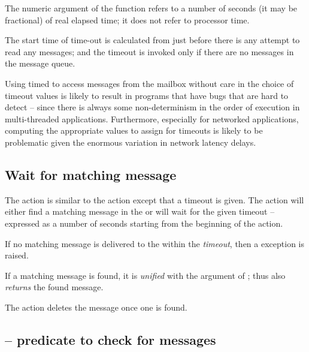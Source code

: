 The numeric argument of the  function refers to a number of seconds (it may be fractional) of real elapsed time; it does not refer to processor time.

The start time of time-out is calculated from just before there is any attempt to read any messages; and the timeout is invoked only if there are no messages in the message queue.

\begin{aside}[\dbend\dbend]
Using timed  to access messages from the mailbox without care in the choice of timeout values is likely to result in programs that have bugs that are hard to detect -- since there is always some non-determinism in the order of execution in multi-threaded applications. Furthermore, especially for networked applications, computing the appropriate values to assign for timeouts is likely to be problematic given the enormous variation in network latency delays.
\end{aside}

\subsection{Wait for matching message}
\label{action:msgw}


The  action is similar to the  action except that a timeout is given. The  action will either find a matching message in the  or will wait for the given timeout -- expressed as a number of seconds starting from the beginning of the  action.

If no matching message is delivered to the  within the \emph{timeout}, then a  exception is raised.

If a matching message is found, it is \emph{unified} with the argument of ; thus  also \emph{returns} the found message.

The  action deletes the message once one is found.


\subsection{ -- predicate to check for messages}
\label{action:pending}

